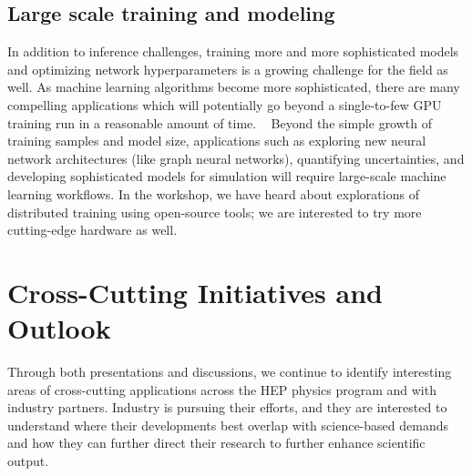 \documentclass[11pt,letterpaper,fleqn]{article}
\begin{document}
\subsection{Large scale training and modeling}

In addition to inference challenges, training more and more sophisticated models and optimizing network hyperparameters is a growing challenge for the field as well. As machine learning algorithms become more sophisticated, there are many compelling applications which will potentially go beyond a single-to-few GPU training run in a reasonable amount of time.   Beyond the simple growth of training samples and model size, applications such as exploring new neural network architectures (like graph neural networks), quantifying uncertainties, and developing sophisticated models for simulation will require large-scale machine learning workflows. In the workshop, we have heard about explorations of distributed training using open-source tools; we are interested to try more cutting-edge hardware as well.

\section{Cross-Cutting Initiatives and Outlook}

\noindent
Through both presentations and discussions, we continue to identify interesting areas of cross-cutting applications across the HEP physics program and with industry partners. Industry is pursuing their efforts, and they are interested to understand where their developments best overlap with science-based demands and how they can further direct their research to further enhance scientific output.
\end{document}
